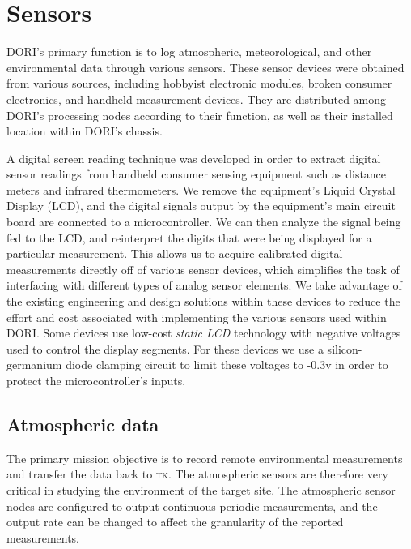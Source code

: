 \section{Sensors}
    DORI's primary function is to log atmospheric, meteorological, and other environmental data through various sensors. These sensor devices were obtained from various sources, including hobbyist electronic modules, broken consumer electronics, and handheld measurement devices. They are distributed among DORI's processing nodes according to their function, as well as their installed location within DORI's chassis.
    
    A digital screen reading technique was developed in order to extract digital sensor readings from handheld consumer sensing equipment such as distance meters and infrared thermometers. We remove the equipment's Liquid Crystal Display (LCD), and the digital signals output by the equipment's main circuit board are connected to a microcontroller. We can then analyze the signal being fed to the LCD, and reinterpret the digits that were being displayed for a particular measurement. This allows us to acquire calibrated digital measurements directly off of various sensor devices, which simplifies the task of interfacing with  different types of analog sensor elements. We take advantage of the existing engineering and design solutions within these devices to reduce the effort and cost associated with implementing the various sensors used within DORI. Some devices use low-cost \emph{static LCD} technology with negative voltages used to control the display segments. For these devices we use a silicon-germanium diode clamping circuit to limit these voltages to -0.3v in order to protect the microcontroller's inputs.

\subsection{Atmospheric data}
The primary mission objective is to record remote environmental measurements and transfer the data back to \textsc{tk}. The atmospheric sensors are therefore very critical in studying the environment of the target site. The atmospheric sensor nodes are configured to output continuous periodic measurements, and the output rate can be changed to affect the granularity of the reported measurements.

